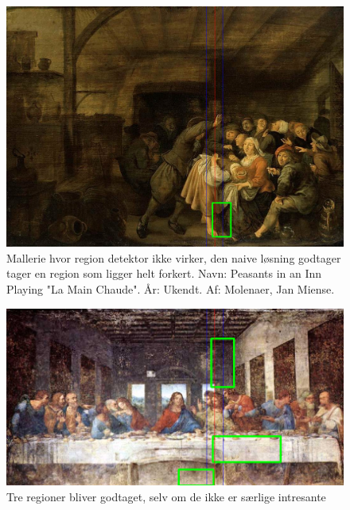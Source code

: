 \begin{figure}[h!!]
	\begin{center}
		\includegraphics[scale=0.3,angle=0]{afsnit/afprovning/billeder/naive_losning/naiv_virker_ikke1.png}
	\end{center}
	\caption[]{Mallerie hvor region detektor ikke virker, den naive
	løsning godtager tager en region som ligger helt forkert. Navn:
	Peasants in an Inn Playing "La Main Chaude". År: Ukendt. Af:
	Molenaer, Jan Miense.}
	\label{naiv_virker_ikke1}
\end{figure}

\begin{figure}[h!!]
	\begin{center}
		\includegraphics[scale=0.3,angle=0]{afsnit/afprovning/billeder/naive_losning/naiv_virker_ikke2.png}
	\end{center}
	\caption[]{Tre regioner bliver godtaget, selv om de ikke er særlige
	intresante }
	\label{naiv_virker_ikke2}
\end{figure}

